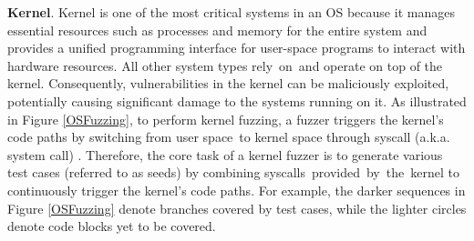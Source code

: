 \textbf{Kernel}. Kernel is one of the most critical systems in an OS because it manages essential resources such as processes and memory for the entire system and provides a unified programming interface for user-space programs to interact with hardware resources. All other system types rely~on~and operate on top of the kernel. Consequently, vulnerabilities in the kernel can be maliciously exploited, potentially causing significant damage to the systems running on it. As illustrated in Figure \ref{OSFuzzing}, to perform kernel fuzzing, a fuzzer triggers the kernel's code paths by switching from user space~to kernel space through syscall  (a.k.a. system call) \cite{Koopman1997ComparingOS}. Therefore, the core task of a kernel fuzzer is to generate various test cases (referred to as seeds) by combining syscalls~provided~by~the~kernel to continuously trigger the kernel's code paths. For example, the darker sequences in Figure \ref{OSFuzzing} denote branches covered by test cases, while the lighter circles denote code blocks yet to be covered.


